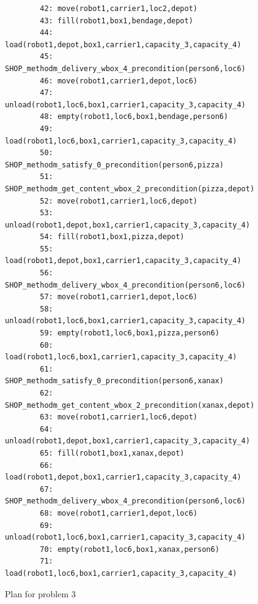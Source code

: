 \begin{figure}
\begin{verbatim}
        42: move(robot1,carrier1,loc2,depot)
        43: fill(robot1,box1,bendage,depot)
        44: load(robot1,depot,box1,carrier1,capacity_3,capacity_4)
        45: SHOP_methodm_delivery_wbox_4_precondition(person6,loc6)
        46: move(robot1,carrier1,depot,loc6)
        47: unload(robot1,loc6,box1,carrier1,capacity_3,capacity_4)
        48: empty(robot1,loc6,box1,bendage,person6)
        49: load(robot1,loc6,box1,carrier1,capacity_3,capacity_4)
        50: SHOP_methodm_satisfy_0_precondition(person6,pizza)
        51: SHOP_methodm_get_content_wbox_2_precondition(pizza,depot)
        52: move(robot1,carrier1,loc6,depot)
        53: unload(robot1,depot,box1,carrier1,capacity_3,capacity_4)
        54: fill(robot1,box1,pizza,depot)
        55: load(robot1,depot,box1,carrier1,capacity_3,capacity_4)
        56: SHOP_methodm_delivery_wbox_4_precondition(person6,loc6)
        57: move(robot1,carrier1,depot,loc6)
        58: unload(robot1,loc6,box1,carrier1,capacity_3,capacity_4)
        59: empty(robot1,loc6,box1,pizza,person6)
        60: load(robot1,loc6,box1,carrier1,capacity_3,capacity_4)
        61: SHOP_methodm_satisfy_0_precondition(person6,xanax)
        62: SHOP_methodm_get_content_wbox_2_precondition(xanax,depot)
        63: move(robot1,carrier1,loc6,depot)
        64: unload(robot1,depot,box1,carrier1,capacity_3,capacity_4)
        65: fill(robot1,box1,xanax,depot)
        66: load(robot1,depot,box1,carrier1,capacity_3,capacity_4)
        67: SHOP_methodm_delivery_wbox_4_precondition(person6,loc6)
        68: move(robot1,carrier1,depot,loc6)
        69: unload(robot1,loc6,box1,carrier1,capacity_3,capacity_4)
        70: empty(robot1,loc6,box1,xanax,person6)
        71: load(robot1,loc6,box1,carrier1,capacity_3,capacity_4)
    \end{verbatim}
    \caption{Plan for problem 3}
    \label{problem3_plan}
\end{figure}

